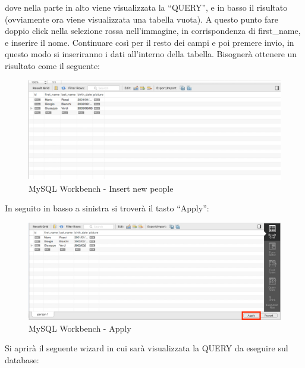 dove nella parte in alto viene visualizzata la “QUERY”, e in basso il risultato (ovviamente ora viene visualizzata una tabella vuota). A questo punto fare doppio click nella selezione rossa nell’immagine, in corrispondenza di first\_name, e inserire il nome. Continuare così per il resto dei campi e poi premere invio, in questo modo si inseriranno i dati all’interno della tabella. Bisognerà ottenere un risultato come il seguente: 

\begin{center}
\begin{figure}[H]
\centering
\includegraphics[scale=1]{figures/mySQL_workbench_personinsert.png}
\caption{MySQL Workbench - Insert new people}
\end{figure}
\end{center}

In seguito in basso a sinistra si troverà il tasto “Apply”:

\begin{center}
\begin{figure}[H]
\centering
\includegraphics[scale=0.8]{figures/mySQL_workbench_apply.png}
\caption{MySQL Workbench - Apply}
\end{figure}
\end{center}

Si aprirà il seguente wizard in cui sarà visualizzata la QUERY da eseguire sul database:


